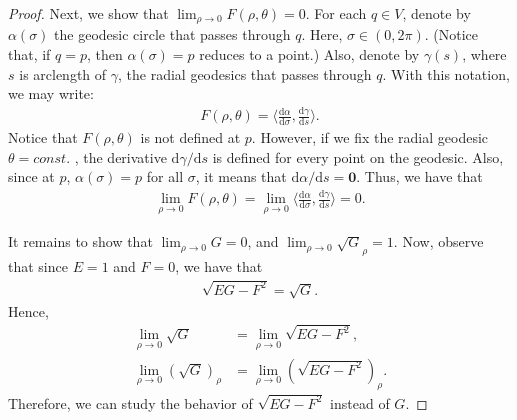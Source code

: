 \documentclass[10pt]{article}
\newcommand{\dee}{\mathrm{d}}
\newcommand{\ve}[1]{\mathbf{#1}}
\newcommand{\ra}{\rightarrow}
\begin{document}
\begin{itemize}
\begin{proof}
      Next, we show that $\lim_{\rho \ra 0} F(\rho,\theta) = 0$. For each $q \in V$, denote by $\alpha(\sigma)$ the geodesic circle that passes through $q$. Here, $\sigma \in (0,2\pi)$. (Notice that, if $q = p$, then $\alpha(\sigma) = p$ reduces to a point.) Also, denote by $\gamma(s)$, where $s$ is arclength of $\gamma$, the radial geodesics that passes through $q$. With this notation, we may write:
      \begin{align*}
        F(\rho, \theta) = \bigg\langle \frac{\dee \alpha}{\dee \sigma}, \frac{\dee \gamma}{\dee s} \bigg\rangle.
      \end{align*}
      Notice that $F(\rho,\theta)$ is not defined at $p$. However, if we fix the radial geodesic $\theta = const.$   , the derivative $\dee \gamma/ \dee s$ is defined for every point on the geodesic. Also, since at $p$, $\alpha(\sigma) = p$ for all $\sigma$, it means that $\dee \alpha / \dee s = \ve{0}.$ Thus, we have that
      \begin{align*}
        \lim_{\rho \ra 0} F(\rho,\theta) = \lim_{\rho \ra 0} \bigg\langle \frac{\dee \alpha}{\dee \sigma}, \frac{\dee \gamma}{\dee s} \bigg\rangle = 0.
      \end{align*}

      It remains to show that $\lim_{\rho \ra 0} G = 0$, and $\lim_{\rho \ra 0} \sqrt{G}_\rho = 1$. Now, observe that since $E = 1$ and $F = 0$, we have that
      \begin{align*}
        \sqrt{EG - F^2} = \sqrt{G}.
      \end{align*}
      Hence,
      \begin{align*}
        \lim_{\rho \ra 0} \sqrt{G} &= \lim_{\rho \ra 0} \sqrt{EG - F^2},\\
        \lim_{\rho \ra 0} (\sqrt{G})_\rho &= \lim_{\rho \ra 0} (\sqrt{EG - F^2})_\rho.
      \end{align*}
      Therefore, we can study the behavior of $\sqrt{EG-F^2}$ instead of $G$.


\end{proof}
\end{itemize}
\end{document}
